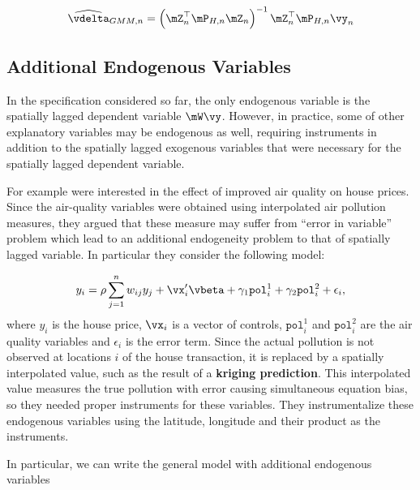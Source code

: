 \documentclass[english,12pt]{book}\usepackage[]{graphicx}\usepackage[]{xcolor}
\begin{document}
\begin{equation}
  \widehat{\vdelta}_{GMM,n} = \left(\mZ^\top_n\mP_{H,n}\mZ_n\right)^{-1}\mZ^\top_n\mP_{H, n}\vy_n
\end{equation}



\subsection{Additional Endogenous Variables}

In the specification considered so far, the only endogenous variable is the spatially lagged dependent variable $\mW\vy$. However, in practice, some of other explanatory variables may be endogenous as well, requiring instruments in addition to the spatially lagged exogenous variables that were necessary for the spatially lagged dependent variable.

For example \cite{anselin2008errors} were interested in the effect of improved air quality on house prices. Since the air-quality variables were obtained using interpolated air pollution measures, they argued that these measure may suffer from ``error in variable'' problem which lead to an additional endogeneity problem to that of spatially lagged variable. In particular they consider the following model:

\begin{equation*}
  y_i = \rho \sum_{j = 1}^nw_{ij}y_j + \vx_i'\vbeta + \gamma_1\texttt{pol}_i^1 + \gamma_2\texttt{pol}_i^2 + \epsilon_i, 
\end{equation*}
%
where $y_i$ is the house price,  $\vx_i$ is a vector of controls,  $\texttt{pol}_i^1$ and $\texttt{pol}_i^2$ are the air quality variables and $\epsilon_i$ is the error term. Since the actual pollution is not observed at locations $i$ of the house transaction, it is replaced by a spatially interpolated value, such as the result of a \textbf{kriging prediction}. This interpolated value measures the true pollution with error causing simultaneous equation bias, so they needed proper instruments for these variables. They instrumentalize these endogenous variables using the latitude, longitude and their product as the instruments. 

In particular, we can write the general model with additional endogenous variables
\end{document}
